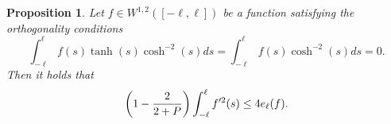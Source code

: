 \documentclass{amsart}
\newtheorem{proposition}{Proposition}
\begin{document}

 \begin{proposition} \label{PoincareInequalityAgain}
 Let $f \in W^{1, 2}([-\ell, \ell])$ be  a function satisfying the orthogonality conditions
 \[
 \int_{- \ell}^\ell f(s) \tanh(s)\cosh^{-2}(s)ds =  \int_{- \ell}^\ell f(s) \cosh^{-2}(s)ds =0. 
 \]
  Then it holds that
 \begin{align} \notag
 \left( 1 - \frac{2}{2 + P} \right)  \int_{-\ell}^\ell f'^2(s)  \leq 4e_\ell (f).
 \end{align}
 \end{proposition}
\end{document}

